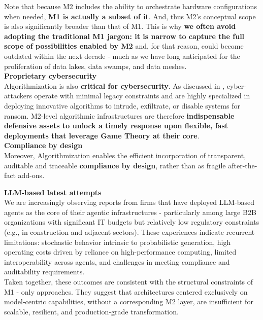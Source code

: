 \documentclass{article}
\begin{document}
Note that because M2 includes the ability to orchestrate hardware configurations when needed, \textbf{M1 is actually a subset of it}. And, thus M2’s conceptual scope is also significantly broader than that of M1. This is why \textbf{we often avoid adopting the traditional M1 jargon: it is narrow to capture the full scope of possibilities enabled by M2} and, for that reason, could become outdated within the next decade - much as we have long anticipated for the proliferation of data lakes, data swamps, and data meshes.\\ 



\textbf{Proprietary cybersecurity}\\

Algorithmization is also \textbf{critical for cybersecurity}. As discussed in \cite{Modern Cybersecurity}, cyber-attackers operate with minimal legacy constraints and are highly specialized in deploying innovative algorithms to intrude, exfiltrate, or disable systems for ransom. M2-level algorithmic infrastructures are therefore \textbf{indispensable defensive assets to unlock a timely response upon flexible, fast deployments that leverage Game Theory at their core}.\\

\textbf{Compliance by design}\\
Moreover, Algorithmization enables the efficient incorporation of transparent, auditable and traceable \textbf{compliance by design}, rather than as fragile after-the-fact add-ons.

\textbf{LLM-based latest attempts}\\
We are increasingly observing reports from firms that have deployed LLM-based agents as the core of their agentic infrastructures - particularly among large B2B organizations with significant IT budgets but relatively low regulatory constraints (e.g., in construction and adjacent sectors). These experiences indicate recurrent limitations: stochastic behavior intrinsic to probabilistic generation, high operating costs driven by reliance on high-performance computing, limited interoperability across agents, and challenges in meeting compliance and auditability requirements.\\

Taken together, these outcomes are consistent with the structural constraints of M1 - only approaches. They suggest that architectures centered exclusively on model-centric capabilities, without a corresponding M2 layer, are insufficient for scalable, resilient, and production-grade transformation.\\
\end{document}
